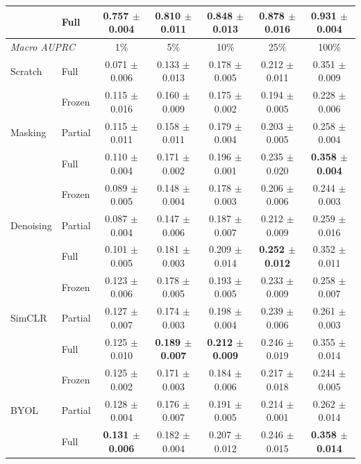 \begin{table}[t]
\begin{tabular}{llccccc}
 & Full & 0.757 $\pm$ 0.004 & 0.810 $\pm$ 0.011 & 0.848 $\pm$ 0.013 & \textbf{0.878 $\pm$ 0.016} & \textbf{0.931 $\pm$ 0.004} \\
\midrule
\multicolumn{2}{l}{\textit{Macro AUPRC}} & 1\% & 5\% & 10\% & 25\% & 100\% \\
\midrule
Scratch & Full & 0.071 $\pm$ 0.006 & 0.133 $\pm$ 0.013 & 0.178 $\pm$ 0.005 & 0.212 $\pm$ 0.011 & 0.351 $\pm$ 0.009 \\
\midrule
\multirow{3}{*}{Masking} & Frozen & 0.115 $\pm$ 0.016 & 0.160 $\pm$ 0.009 & 0.175 $\pm$ 0.002 & 0.194 $\pm$ 0.005 & 0.228 $\pm$ 0.006 \\
 & Partial & 0.115 $\pm$ 0.011 & 0.158 $\pm$ 0.011 & 0.179 $\pm$ 0.004 & 0.203 $\pm$ 0.005 & 0.258 $\pm$ 0.004 \\
 & Full & 0.110 $\pm$ 0.004 & 0.171 $\pm$ 0.002 & 0.196 $\pm$ 0.001 & 0.235 $\pm$ 0.020 & \textbf{0.358 $\pm$ 0.004} \\
\midrule
\multirow{3}{*}{Denoising} & Frozen & 0.089 $\pm$ 0.005 & 0.148 $\pm$ 0.004 & 0.178 $\pm$ 0.003 & 0.206 $\pm$ 0.006 & 0.244 $\pm$ 0.003 \\
 & Partial & 0.087 $\pm$ 0.004 & 0.147 $\pm$ 0.006 & 0.187 $\pm$ 0.007 & 0.212 $\pm$ 0.009 & 0.259 $\pm$ 0.016 \\
 & Full & 0.101 $\pm$ 0.005 & 0.181 $\pm$ 0.003 & 0.209 $\pm$ 0.014 & \textbf{0.252 $\pm$ 0.012} & 0.352 $\pm$ 0.011 \\
\midrule
\multirow{3}{*}{SimCLR} & Frozen & 0.123 $\pm$ 0.006 & 0.178 $\pm$ 0.005 & 0.193 $\pm$ 0.005 & 0.233 $\pm$ 0.009 & 0.258 $\pm$ 0.007 \\
 & Partial & 0.127 $\pm$ 0.007 & 0.174 $\pm$ 0.003 & 0.198 $\pm$ 0.004 & 0.239 $\pm$ 0.006 & 0.261 $\pm$ 0.003 \\
 & Full & 0.125 $\pm$ 0.010 & \textbf{0.189 $\pm$ 0.007} & \textbf{0.212 $\pm$ 0.009} & 0.246 $\pm$ 0.019 & 0.355 $\pm$ 0.014 \\
\midrule
\multirow{3}{*}{BYOL} & Frozen & 0.125 $\pm$ 0.002 & 0.171 $\pm$ 0.003 & 0.184 $\pm$ 0.006 & 0.217 $\pm$ 0.018 & 0.244 $\pm$ 0.005 \\
 & Partial & 0.128 $\pm$ 0.004 & 0.176 $\pm$ 0.007 & 0.191 $\pm$ 0.005 & 0.214 $\pm$ 0.001 & 0.262 $\pm$ 0.014 \\
 & Full & \textbf{0.131 $\pm$ 0.006} & 0.182 $\pm$ 0.004 & 0.207 $\pm$ 0.012 & 0.246 $\pm$ 0.015 & \textbf{0.358 $\pm$ 0.014} \\
\bottomrule
\end{tabular}
\end{table}
